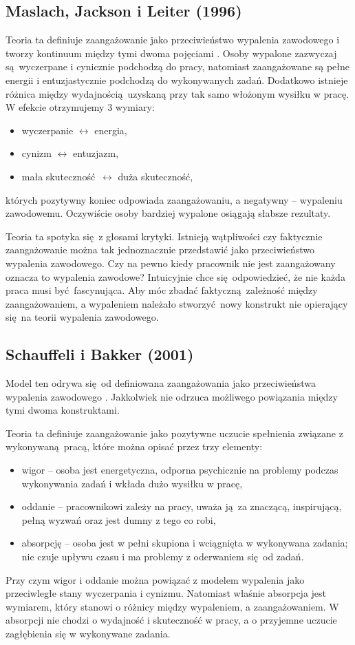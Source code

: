 \subsection{Maslach, Jackson i Leiter (1996)}
\label{sec:model-maslach}
Teoria ta definiuje zaangażowanie jako przeciwieństwo wypalenia zawodowego i tworzy kontinuum między tymi dwoma pojęciami \cite{maslach1997truth}. Osoby wypalone zazwyczaj są wyczerpane i cynicznie podchodzą do pracy, natomiast zaangażowane są pełne energii i entuzjastycznie podchodzą do wykonywanych zadań. Dodatkowo istnieje różnica między wydajnością uzyskaną przy tak samo włożonym wysiłku w pracę. W efekcie otrzymujemy 3 wymiary:
\begin{itemize}
\item wyczerpanie $\leftrightarrow$ energia,
\item cynizm $\leftrightarrow$ entuzjazm,
\item mała skuteczność $\leftrightarrow$ duża skuteczność,
\end{itemize}
których pozytywny koniec odpowiada zaangażowaniu, a negatywny -- wypaleniu zawodowemu. Oczywiście osoby bardziej wypalone osiągają słabsze rezultaty.

Teoria ta spotyka się z głosami krytyki. Istnieją wątpliwości czy faktycznie zaangażowanie można tak jednoznacznie przedstawić jako przeciwieństwo wypalenia zawodowego. Czy na pewno kiedy pracownik nie jest zaangażowany oznacza to wypalenia zawodowe? Intuicyjnie chce się odpowiedzieć, że nie każda praca musi być fascynująca. Aby móc zbadać faktyczną zależność między zaangażowaniem, a wypaleniem należało stworzyć nowy konstrukt nie opierający się na teorii wypalenia zawodowego.

\subsection{Schauffeli i Bakker (2001)}
\label{sec:model-schauffeli}
Model ten odrywa się od definiowana zaangażowania jako przeciwieństwa wypalenia zawodowego \cite{schaufeli2002measurement}. Jakkolwiek nie odrzuca możliwego powiązania między tymi dwoma konstruktami. 

Teoria ta definiuje zaangażowanie jako pozytywne uczucie spełnienia związane z wykonywaną pracą, które można opisać przez trzy elementy:
\begin{itemize}
\item wigor -- osoba jest energetyczna, odporna psychicznie na problemy podczas wykonywania zadań i wkłada dużo wysiłku w pracę,
\item oddanie -- pracownikowi zależy na pracy, uważa ją za znaczącą, inspirującą, pełną wyzwań oraz jest dumny z tego co robi,
\item absorpcję -- osoba jest w pełni skupiona i wciągnięta w wykonywana zadania; nie czuje upływu czasu i ma problemy z oderwaniem się od zadań.
\end{itemize}
Przy czym wigor i oddanie można powiązać z modelem wypalenia jako przeciwległe stany wyczerpania i cynizmu. Natomiast właśnie absorpcja jest wymiarem, który stanowi o różnicy między wypaleniem, a zaangażowaniem. W absorpcji nie chodzi o wydajność i skuteczność w pracy, a o przyjemne uczucie zagłębienia się w wykonywane zadania.

